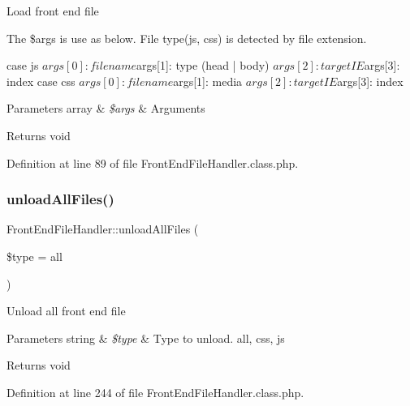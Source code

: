Load front end file

The \$args is use as below. File type(js, css) is detected by file extension.


\begin{DoxyPre}
case js
        $args[0]: file name
        $args[1]: type (head | body)
        $args[2]: target IE
        $args[3]: index
case css
        $args[0]: file name
        $args[1]: media
        $args[2]: target IE
        $args[3]: index
\end{DoxyPre}



\begin{DoxyParams}[1]{Parameters}
array & {\em \$args} & Arguments \\
\hline
\end{DoxyParams}
\begin{DoxyReturn}{Returns}
void 
\end{DoxyReturn}


Definition at line 89 of file Front\+End\+File\+Handler.\+class.\+php.

\mbox{\label{classFrontEndFileHandler_ad31d9887bc8b135b4b26f8fb225abe43}} 
\subsubsection{\texorpdfstring{unload\+All\+Files()}{unloadAllFiles()}}
{\footnotesize\ttfamily Front\+End\+File\+Handler\+::unload\+All\+Files (\begin{DoxyParamCaption}\item[{}]{\$type = {\ttfamily \textquotesingle{}all\textquotesingle{}} }\end{DoxyParamCaption})}

Unload all front end file


\begin{DoxyParams}[1]{Parameters}
string & {\em \$type} & Type to unload. all, css, js \\
\hline
\end{DoxyParams}
\begin{DoxyReturn}{Returns}
void 
\end{DoxyReturn}


Definition at line 244 of file Front\+End\+File\+Handler.\+class.\+php.


